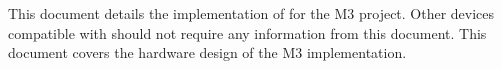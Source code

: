 This document details the implementation of \bus for the M3 project. Other
devices compatible with \bus should not require any information from this
document. This document covers the hardware design of the M3 \bus
implementation.
